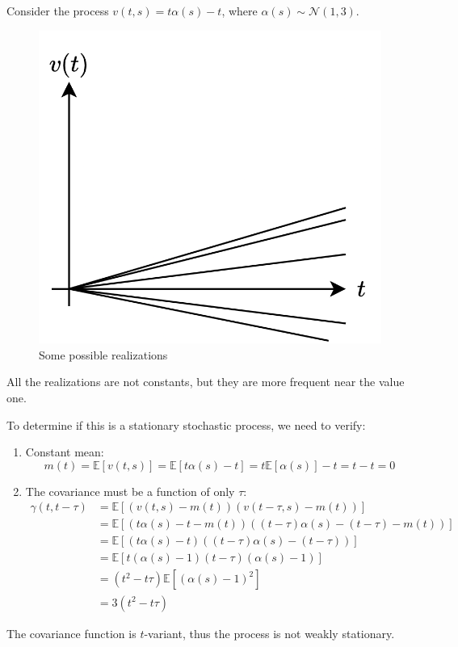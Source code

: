 \begin{example}
    Consider the process $v(t,s)=t\alpha(s)-t$, where $\alpha(s) \sim \mathcal{N}(1,3)$. 
    \begin{figure}[H]
        \centering
        \includegraphics[width=0.35\linewidth]{images/stationary.png}
        \caption{Some possible realizations}
    \end{figure}
    All the realizations are not constants, but they are more frequent near the value one.
    
    To determine if this is a stationary stochastic process, we need to verify: 
    \begin{enumerate}
        \item Constant mean: 
            \[m(t)=\mathbb{E}\left[v(t,s)\right]=\mathbb{E}\left[t\alpha(s)-t\right]= t\mathbb{E}\left[\alpha(s)\right]-t =t-t=0\]
        \item The covariance must be a function of only $\tau$: 
            \begin{align*}
                \gamma(t,t-\tau)&=\mathbb{E}\left[\left(v(t,s)-m(t)\right)\left(v(t-\tau,s)-m(t)\right)\right] \\
                                &=\mathbb{E}\left[\left(t\alpha(s)-t-m(t)\right)\left((t-\tau)\alpha(s)-(t-\tau)-m(t)\right)\right] \\
                                &=\mathbb{E}\left[\left(t\alpha(s)-t\right)\left((t-\tau)\alpha(s)-(t-\tau)\right)\right] \\
                                &=\mathbb{E}\left[t\left(\alpha(s)-1\right)(t-\tau)\left(\alpha(s)-1\right)\right] \\
                                &=(t^2-t\tau)\mathbb{E}\left[\left(\alpha(s)-1\right)^2\right] \\
                                &=3(t^2-t\tau)
            \end{align*}
    \end{enumerate}
    The covariance function is $t$-variant, thus the process is not weakly stationary.
\end{example}